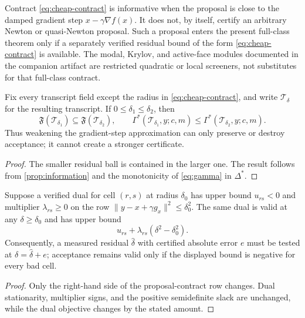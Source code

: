 \documentclass[smallextended]{svjour3}
\newcommand{\cT}{\mathcal{T}}
\newcommand{\norm}[1]{\lVert #1\rVert}
\begin{document}
Contract \eqref{eq:cheap-contract} is informative when the proposal is close
to the damped gradient step $x-\gamma\nabla f(x)$.  It does not, by itself,
certify an arbitrary Newton or quasi-Newton proposal.  Such a proposal enters
the present full-class theorem only if a separately verified residual
bound of the form \eqref{eq:cheap-contract} is available.  The modal, Krylov,
and active-face modules documented in the companion artifact are restricted
quadratic or local screeners, not substitutes for that full-class contract.

\begin{proposition}
\label{prop:radius-monotonicity}
Fix every transcript field except the radius in
\eqref{eq:cheap-contract}, and write $\cT_\delta$ for the resulting transcript.
If $0\leq\delta_1\leq\delta_2$, then
\[
 \mathfrak F(\cT_{\delta_1})\subseteq
 \mathfrak F(\cT_{\delta_2}),\qquad
 \Gamma^*(\cT_{\delta_1},y;c,m)
 \leq \Gamma^*(\cT_{\delta_2},y;c,m).
\]
Thus weakening the gradient-step approximation can only preserve or destroy
acceptance; it cannot create a stronger certificate.
\end{proposition}

\begin{proof}
The smaller residual ball is contained in the larger one.  The result follows
from \cref{prop:information} and the monotonicity of \eqref{eq:gamma} in
$\Delta^*$.
\end{proof}

\begin{proposition}
\label{prop:radius-error}
Suppose a verified dual for cell $(r,s)$ at radius $\delta_0$ has upper bound
$u_{rs}<0$ and multiplier $\lambda_{rs}\geq0$ on the row
$\norm{y-x+\gamma g_x}^2\leq\delta_0^2$.  The same dual is valid at any
$\delta\geq\delta_0$ and has upper bound
\[
 u_{rs}+\lambda_{rs}(\delta^2-\delta_0^2).
\]
Consequently, a measured residual $\widehat\delta$ with certified absolute
error $e$ must be tested at $\delta=\widehat\delta+e$; acceptance remains valid
only if the displayed bound is negative for every bad cell.
\end{proposition}

\begin{proof}
Only the right-hand side of the proposal-contract row changes.  Dual
stationarity, multiplier signs, and the positive semidefinite slack are
unchanged, while the dual objective changes by the stated amount.
\end{proof}
\end{document}
